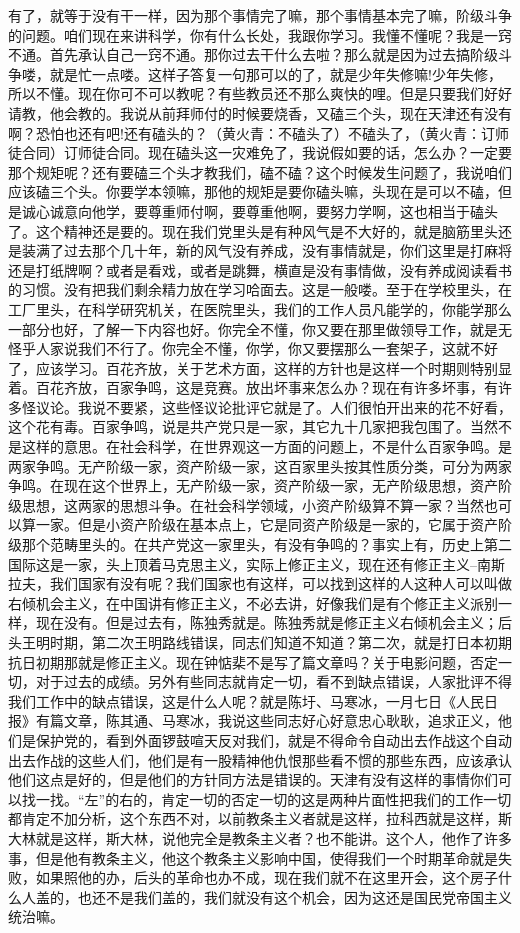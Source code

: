 有了，就等于没有干一样，因为那个事情完了嘛，那个事情基本完了嘛，阶级斗争的问题。咱们现在来讲科学，你有什么长处，我跟你学习。我懂不懂呢？我是一窍不通。首先承认自己一窍不通。那你过去干什么去啦？那么就是因为过去搞阶级斗争喽，就是忙一点喽。这样子答复一句那可以的了，就是少年失修嘛!少年失修，所以不懂。现在你可不可以教呢？有些教员还不那么爽快的哩。但是只要我们好好请教，他会教的。我说从前拜师付的时候要烧香，又磕三个头，现在天津还有没有啊？恐怕也还有吧!还有磕头的？（黄火青：不磕头了）不磕头了，（黄火青：订师徒合同）订师徒合同。现在磕头这一灾难免了，我说假如要的话，怎么办？一定要那个规矩呢？还有要磕三个头才教我们，磕不磕？这个时候发生问题了，我说咱们应该磕三个头。你要学本领嘛，那他的规矩是要你磕头嘛，头现在是可以不磕，但是诚心诚意向他学，要尊重师付啊，要尊重他啊，要努力学啊，这也相当于磕头了。这个精神还是要的。现在我们党里头是有种风气是不大好的，就是脑筋里头还是装满了过去那个几十年，新的风气没有养成，没有事情就是，你们这里是打麻将还是打纸牌啊？或者是看戏，或者是跳舞，横直是没有事情做，没有养成阅读看书的习惯。没有把我们剩余精力放在学习哈面去。这是一般喽。至于在学校里头，在工厂里头，在科学研究机关，在医院里头，我们的工作人员凡能学的，你能学那么一部分也好，了解一下内容也好。你完全不懂，你又要在那里做领导工作，就是无怪乎人家说我们不行了。你完全不懂，你学，你又要摆那么一套架子，这就不好了，应该学习。百花齐放，关于艺术方面，这样的方针也是这样一个时期则特别显着。百花齐放，百家争鸣，这是竞赛。放出坏事来怎么办？现在有许多坏事，有许多怪议论。我说不要紧，这些怪议论批评它就是了。人们很怕开出来的花不好看，这个花有毒。百家争鸣，说是共产党只是一家，其它九十几家把我包围了。当然不是这样的意思。在社会科学，在世界观这一方面的问题上，不是什么百家争鸣。是两家争鸣。无产阶级一家，资产阶级一家，这百家里头按其性质分类，可分为两家争鸣。在现在这个世界上，无产阶级一家，资产阶级一家，无产阶级思想，资产阶级思想，这两家的思想斗争。在社会科学领域，小资产阶级算不算一家？当然也可以算一家。但是小资产阶级在基本点上，它是同资产阶级是一家的，它属于资产阶级那个范畴里头的。在共产党这一家里头，有没有争鸣的？事实上有，历史上第二国际这是一家，头上顶着马克思主义，实际上修正主义，现在还有修正主义--南斯拉夫，我们国家有没有呢？我们国家也有这样，可以找到这样的人这种人可以叫做右倾机会主义，在中国讲有修正主义，不必去讲，好像我们是有个修正主义派别一样，现在没有。但是过去有，陈独秀就是。陈独秀就是修正主义右倾机会主义；后头王明时期，第二次王明路线错误，同志们知道不知道？第二次，就是打日本初期抗日初期那就是修正主义。现在钟惦棐不是写了篇文章吗？关于电影问题，否定一切，对于过去的成绩。另外有些同志就肯定一切，看不到缺点错误，人家批评不得我们工作中的缺点错误，这是什么人呢？就是陈圩、马寒冰，一月七日《人民日报》有篇文章，陈其通、马寒冰，我说这些同志好心好意忠心耿耿，追求正义，他们是保护党的，看到外面锣鼓喧天反对我们，就是不得命令自动出去作战这个自动出去作战的这些人们，他们是有一股精神他仇恨那些看不惯的那些东西，应该承认他们这点是好的，但是他们的方针同方法是错误的。天津有没有这样的事情你们可以找一找。“左”的右的，肯定一切的否定一切的这是两种片面性把我们的工作一切都肯定不加分析，这个东西不对，以前教条主义者就是这样，拉科西就是这样，斯大林就是这样，斯大林，说他完全是教条主义者？也不能讲。这个人，他作了许多事，但是他有教条主义，他这个教条主义影响中国，使得我们一个时期革命就是失败，如果照他的办，后头的革命也办不成，现在我们就不在这里开会，这个房子什么人盖的，也还不是我们盖的，我们就没有这个机会，因为这还是国民党帝国主义统治嘛。